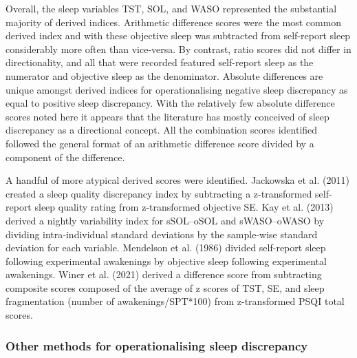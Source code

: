 \documentclass[
]{article}
\begin{document}
Overall, the sleep variables TST, SOL, and WASO represented the substantial majority of derived indices. Arithmetic difference scores were the most common derived index and with these objective sleep was subtracted from self-report sleep considerably more often than vice-versa. By contrast, ratio scores did not differ in directionality, and all that were recorded featured self-report sleep as the numerator and objective sleep as the denominator. Absolute differences are unique amongst derived indices for operationalising negative sleep discrepancy as equal to positive sleep discrepancy. With the relatively few absolute difference scores noted here it appears that the literature has mostly conceived of sleep discrepancy as a directional concept. All the combination scores identified followed the general format of an arithmetic difference score divided by a component of the difference.

A handful of more atypical derived scores were identified. Jackowska et al. (2011) created a sleep quality discrepancy index by subtracting a z-transformed self-report sleep quality rating from z-transformed objective SE. Kay et al. (2013) derived a nightly variability index for sSOL--oSOL and sWASO--oWASO by dividing intra-individual standard deviations by the sample-wise standard deviation for each variable. Mendelson et al. (1986) divided self-report sleep following experimental awakenings by objective sleep following experimental awakenings. Winer et al. (2021) derived a difference score from subtracting composite scores composed of the average of z scores of TST, SE, and sleep fragmentation (number of awakenings/SPT*100) from z-transformed PSQI total scores.

\subsubsection{Other methods for operationalising sleep discrepancy}\label{altdisc}
\end{document}
